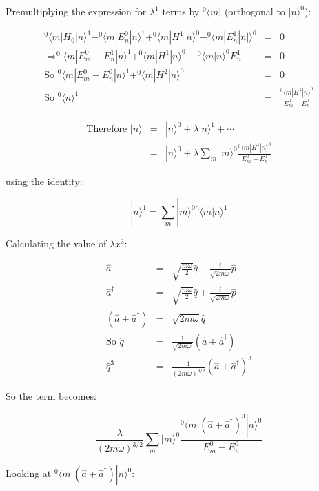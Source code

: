 Premultiplying the expression for $\lambda^1$ terms by $^0\langle m|$ (orthogonal to $|n\rangle^0$):

\begin{eqnarray*}
  ^0\langle m|H_0|n\rangle^1 - ^0\langle m|E^0_n|n\rangle^1 + ^0\langle m|H^1|n\rangle^0 - ^0\langle m|E^1_n|n|\rangle^0 & = & 0 \\
  \Rightarrow ^0\langle m|E^0_m-E^1_n|n\rangle^1 + ^0\langle m|H^1|n\rangle^0 - {^0\langle m|n\rangle^0}E^1_n & = & 0 \\
  \textrm{So } ^0\langle m|E^0_m-E^0_n|n\rangle^1 + ^0\langle m|H^2|n\rangle^0 & = & 0 \\
  \textrm{So } ^0\langle n\rangle^1 & = & \frac{^0\langle m|H^1|n\rangle^0}{E^0_m - E^0_n}
\end{eqnarray*}

\begin{eqnarray*}
  \textrm{Therefore } |n\rangle & = & |n\rangle^0 + \lambda|n\rangle^1 + \cdots \\
  & = & |n\rangle^0 + \lambda \sum_m |m \rangle^0 \frac{^0\langle m|H^1|n\rangle^0}{E^0_m - E^0_n}
\end{eqnarray*}

using the identity:

\[
  |n\rangle^1 = \displaystyle\sum_m |m\rangle^0 {}^0\langle m|n\rangle^1
\]

Calculating the value of $\lambda x^3$:

\begin{eqnarray*}
  \hat{a} & = & \sqrt{\frac{m\omega}{2}}\hat{q} - \frac{i}{\sqrt{2m\omega}}\hat{p} \\
  \hat{a}^{\dagger} & = & \sqrt{\frac{m\omega}{2}}\hat{q} + \frac{i}{\sqrt{2m\omega}}\hat{p} \\
  \left(\hat{a} + \hat{a}^{\dagger}\right) & = & \sqrt{2m\omega}\hat{q} \\
  \textrm{So } \hat{q} & = & \frac{1}{\sqrt{2m\omega}}\left(\hat{a} + \hat{a}^{\dagger}\right) \\
  \hat{q}^3 & = & \frac{1}{\left(2m\omega\right)^{3/2}}\left(\hat{a} + \hat{a}^{\dagger}\right)^3
\end{eqnarray*}

So the term becomes:

\[
  \frac{\lambda}{\left(2m\omega\right)^{3/2}}\displaystyle\sum_m |m\rangle^0 \frac{^0\langle m|\left( \hat{a} + \hat{a}^{\dagger}\right)^3|n\rangle^0}{E^0_m - E^0_n}
\]

Looking at $^0\langle m|\left(\hat{a} + \hat{a}^{\dagger}\right)|n\rangle^0$:


